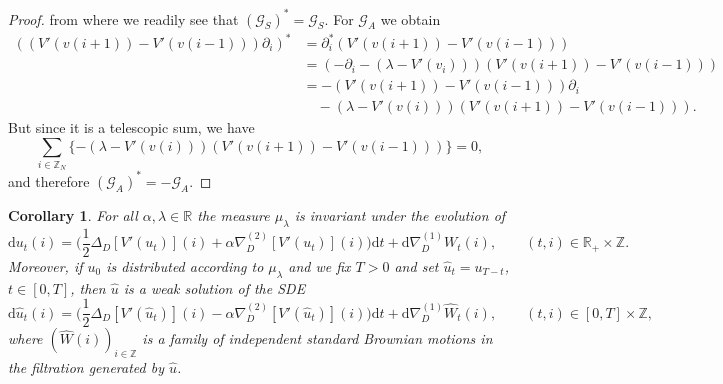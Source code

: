 \documentclass[11pt, a4paper]{article}
\newcommand{\mathd}{\mathrm{d}}
\newtheorem{corollary}[theorem]{Corollary}
\newcommand{\CG}{\mathscr{G}}
\newcommand{\R}{\mathbb{R}}
\newcommand{\1}{\mathbf{1}}
\begin{document}
\begin{proof}
  from where we readily see that $(\CG_S)^\ast = \CG_S$.
  For $\CG_A$ we obtain
  \begin{align*}
   ((V' (v(i + 1)) - V' (v(i - 1))) \partial_i)^{\ast}
   &= \partial_i^{\ast} (V' (v(i + 1)) - V' (v(i - 1))) \\
   & = (- \partial_i - (\lambda - V' (v_i))) (V' (v(i + 1)) - V' (v(i - 1))) \\
   &= - (V' (v(i + 1)) - V' (v(i - 1))) \partial_i \\
   &\quad - (\lambda - V' (v(i))) (V' (v(i + 1)) - V' (v(i - 1))).
  \end{align*}
  But since it is a telescopic sum, we have
  \[ \sum_{i \in \mathbb{Z}_N} \{ - (\lambda - V' (v(i))) (V' (v(i + 1)) - V' (v(i - 1))) \} = 0, \]
  and therefore $\left( \CG_A \right)^{\ast} = - \CG_A$.
\end{proof}

\begin{corollary}
  \label{cor:reversedEvolution}For all $\alpha, \lambda \in \mathbb{R}$ the
  measure ${\mu}_{\lambda}$ is invariant under the evolution of
  \begin{equation}\label{eq:sbe with alpha}
     \mathd u_t (i) = \Big( \frac{1}{2} \Delta_D [V'
    (u_t)] (i) + \alpha \nabla^{(2)}_D [V' (u_t)] (i) \Big) \mathd t +
    \mathd \nabla^{(1)}_D W_t (i), \hspace{2em} (t,i) \in \R_+ \times \mathbb{Z}.
  \end{equation}
  Moreover, if $u_0$ is distributed according to ${\mu}_{\lambda}$ and we
  fix $T > 0$ and set $\hat{u}_t = u_{T - t}$, $t \in [0, T]$, then $\hat{u}$
  is a weak solution of the SDE
  \[ \mathd \hat{u}_t (i) = \Big( \frac{1}{2} \Delta_D [V' (\hat{u}_t)] (i) -
     \alpha \nabla^{(2)}_D [V' (\hat{u}_t)] (i) \Big) \mathd t + \mathd
     \nabla^{(1)}_D \hat{W}_t (i), \hspace{2em} (t,i) \in [0,T] \times \mathbb{Z}, \]
  where $(\hat{W} (i))_{i \in \mathbb{Z}}$ is a family of independent
  standard Brownian motions in the filtration generated by $\hat{u}$.
\end{corollary}
\end{document}
